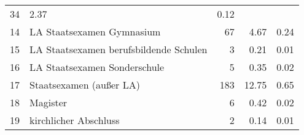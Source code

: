 \begin{longtable}{lXrrr}
       \num{34} &
       \num[round-mode=places,round-precision=2]{2.37} &
         \num[round-mode=places,round-precision=2]{0.12} \\

     14 &
     \multicolumn{1}{X}{ LA Staatsexamen Gymnasium   } &


       \num{67} &
       \num[round-mode=places,round-precision=2]{4.67} &
         \num[round-mode=places,round-precision=2]{0.24} \\

     15 &
     \multicolumn{1}{X}{ LA Staatsexamen berufsbildende Schulen   } &


       \num{3} &
       \num[round-mode=places,round-precision=2]{0.21} &
         \num[round-mode=places,round-precision=2]{0.01} \\

     16 &
     \multicolumn{1}{X}{ LA Staatsexamen Sonderschule   } &


       \num{5} &
       \num[round-mode=places,round-precision=2]{0.35} &
         \num[round-mode=places,round-precision=2]{0.02} \\

     17 &
     \multicolumn{1}{X}{ Staatsexamen (außer LA)   } &


       \num{183} &
       \num[round-mode=places,round-precision=2]{12.75} &
         \num[round-mode=places,round-precision=2]{0.65} \\

     18 &
     \multicolumn{1}{X}{ Magister   } &


       \num{6} &
       \num[round-mode=places,round-precision=2]{0.42} &
         \num[round-mode=places,round-precision=2]{0.02} \\

     19 &
     \multicolumn{1}{X}{ kirchlicher Abschluss   } &


       \num{2} &
       \num[round-mode=places,round-precision=2]{0.14} &
         \num[round-mode=places,round-precision=2]{0.01} \\


\end{longtable}
